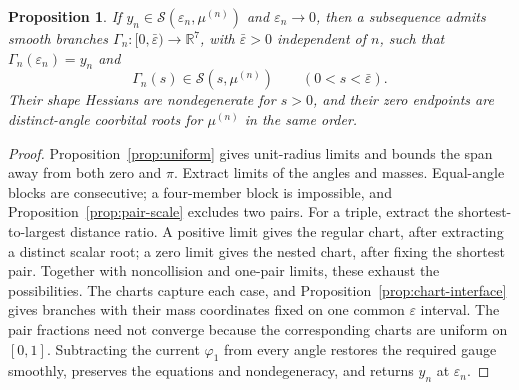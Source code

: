 \documentclass[11pt,a4paper]{article}
\numberwithin{equation}{section}
\newtheorem{proposition}[theorem]{Proposition}
\theoremstyle{remark}
\newcommand{\R}{\mathbb R}
\newcommand{\eps}{\varepsilon}
\begin{document}
\begin{proposition}\label{prop:connection}
If $y_n\in\mathcal S(\eps_n,\mu^{(n)})$ and $\eps_n\to0$, then a subsequence admits smooth branches $\Gamma_n:[0,\bar\eps)\to\R^7$, with $\bar\eps>0$ independent of $n$, such that $\Gamma_n(\eps_n)=y_n$ and
\[
 \Gamma_n(s)\in\mathcal S(s,\mu^{(n)})\qquad(0<s<\bar\eps).
\]
Their shape Hessians are nondegenerate for $s>0$, and their zero endpoints are distinct-angle coorbital roots for $\mu^{(n)}$ in the same order.
\end{proposition}
\begin{proof}
Proposition~\ref{prop:uniform} gives unit-radius limits and bounds the span away from both zero and $\pi$.
Extract limits of the angles and masses. Equal-angle blocks are consecutive; a four-member block is impossible, and Proposition~\ref{prop:pair-scale} excludes two pairs.
For a triple, extract the shortest-to-largest distance ratio. A positive limit gives the regular chart, after extracting a distinct scalar root; a zero limit gives the nested chart, after fixing the shortest pair.
Together with noncollision and one-pair limits, these exhaust the possibilities.
The charts capture each case, and Proposition~\ref{prop:chart-interface} gives branches with their mass coordinates fixed on one common $\eps$ interval. The pair fractions need not converge because the corresponding charts are uniform on $[0,1]$.
Subtracting the current $\varphi_1$ from every angle restores the required gauge smoothly, preserves the equations and nondegeneracy, and returns $y_n$ at $\eps_n$.
\end{proof}
\end{document}
